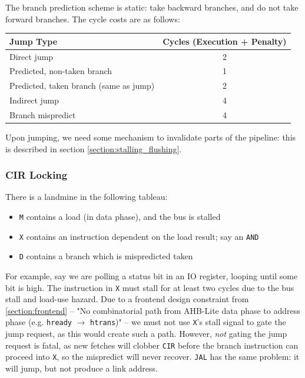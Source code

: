 \documentclass[notitlepage]{article}
\begin{document}
The branch prediction scheme is static: take backward branches, and do not take forward branches. The cycle costs are as follows:

\begin{center}
\begin{tabular}{l c}
\hline
Jump Type & Cycles (Execution + Penalty) \\
\hline
Direct jump & 2 \\
Predicted, non-taken branch & 1 \\
Predicted, taken branch (same as jump) & 2 \\
Indirect jump & 4 \\
Branch mispredict & 4 \\
\hline
\end{tabular}
\end{center}

Upon jumping, we need some mechanism to invalidate parts of the pipeline: this is described in section \ref{section:stalling_flushing}.

\subsubsection{CIR Locking}

There is a landmine in the following tableau:

\begin{itemize}
	\item \texttt{M} contains a load (in data phase), and the bus is stalled
	\item \texttt{X} contains an instruction dependent on the load result; say an \texttt{AND}
	\item \texttt{D} contains a branch which is mispredicted taken
\end{itemize}

For example, say we are polling a status bit in an IO register, looping until some bit is high. The instruction in \texttt{X} must stall for at least two cycles due to the bus stall and load-use hazard. Due to a frontend design constraint from \ref{section:frontend} -- "No combinatorial path from AHB-Lite data phase to address phase (e.g. \texttt{hready} $\to$ \texttt{htrans})" -- we must not use \texttt{X}'s stall signal to gate the jump request, as this would create such a path. However, \textit{not} gating the jump request is fatal, as new fetches will clobber \texttt{CIR} before the branch instruction can proceed into \texttt{X}, so the mispredict will never recover. \texttt{JAL} has the same problem: it will jump, but not produce a link address.
\end{document}
